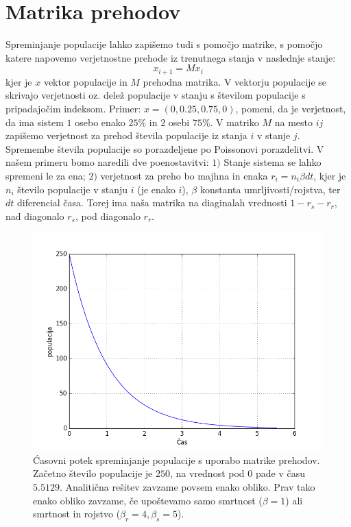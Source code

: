 \documentclass[slovene,11pt,a4paper]{article}
\numberwithin{equation}{section} %
\numberwithin{figure}{section} %
\numberwithin{table}{section} %
\begin{document}
\clearpage

\section{Matrika prehodov}
Spreminjanje populacije lahko zapišemo tudi s pomočjo matrike, s pomočjo katere napovemo verjetnostne prehode iz trenutnega stanja v naslednje stanje:
\begin{equation}
x_{i+1}=Mx_i
\end{equation}
kjer je $x$ vektor populacije in $M$ prehodna matrika. V vektorju populacije se skrivajo verjetnosti oz. delež populacije v stanju s številom populacije s pripadajočim indeksom. Primer: $x=(0,0.25,0.75,0)$, pomeni, da je verjetnost, da ima sistem $1$ osebo enako $25\%$ in $2$ osebi $75\%$.
V matriko $M$ na mesto $ij$ zapišemo verjetnost za prehod števila populacije iz stanja $i$ v stanje $j$. Spremembe števila populacije so porazdeljene po Poissonovi porazdelitvi. V našem primeru bomo naredili dve poenostavitvi: $1)$ Stanje sistema se lahko spremeni le za ena; $2)$ verjetnost za preho bo majhna in enaka $r_i=n_i \beta	dt$, kjer je $n_i$ število populacije v stanju $i$ (je enako $i$), $\beta$ konstanta umrljivosti/rojstva, ter $dt$ diferencial časa. Torej ima naša matrika na diaginalah vrednosti $1-r_s-r_r$, nad diagonalo $r_s$, pod diagonalo $r_r$.

\begin{figure}[h]
\begin{center}
\includegraphics[scale=0.65]{slike/populacija_matrika_beta_0.png}
\caption{Ćasovni potek spreminjanje populacije s uporabo matrike prehodov. Začetno število populacije je $250$, na vrednost pod $0$ pade v času $5.5129$. Analitična rešitev zavzame povsem enako obliko. Prav tako enako obliko zavzame, če upoštevamo samo smrtnost ($\beta=1$) ali smrtnost in rojstvo ($\beta_r=4, \beta_s=5$).}
\label{graf-enak-za vse}
\end{center}
\end{figure}
\end{document}

